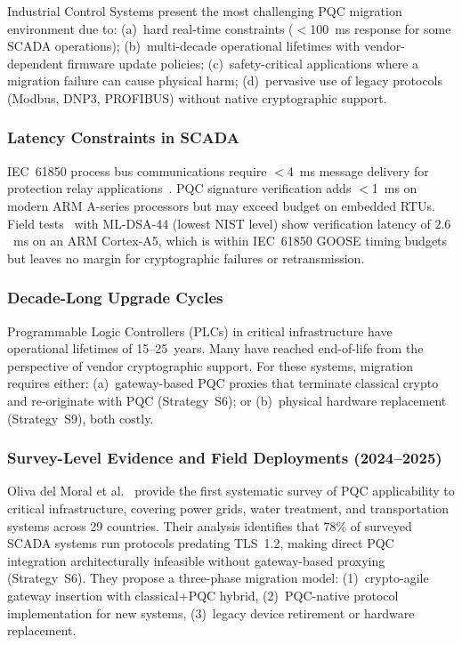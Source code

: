 \documentclass[journal]{IEEEtran}
\begin{document}
Industrial Control Systems present the most challenging PQC migration environment
due to: (a)~hard real-time constraints ($<$100~ms response for some SCADA
operations); (b)~multi-decade operational lifetimes with vendor-dependent
firmware update policies; (c)~safety-critical applications where a migration
failure can cause physical harm; (d)~pervasive use of legacy protocols
(Modbus, DNP3, PROFIBUS) without native cryptographic support.

\subsubsection{Latency Constraints in SCADA}

IEC~61850 process bus communications require $<$4~ms message delivery for
protection relay applications~\cite{iec61850}. PQC signature verification
adds $<$1~ms on modern ARM A-series processors but may exceed budget on
embedded RTUs. Field tests~\cite{tran2023pqc} with ML-DSA-44 (lowest NIST
level) show verification latency of $2.6$~ms on an ARM Cortex-A5, which
is within IEC~61850 GOOSE timing budgets but leaves no margin for cryptographic
failures or retransmission.

\subsubsection{Decade-Long Upgrade Cycles}

Programmable Logic Controllers (PLCs) in critical infrastructure have
operational lifetimes of 15--25~years. Many have reached end-of-life from
the perspective of vendor cryptographic support. For these systems,
migration requires either: (a)~gateway-based PQC proxies that terminate
classical crypto and re-originate with PQC (Strategy~S6); or (b)~physical
hardware replacement (Strategy~S9), both costly.

\subsubsection{Survey-Level Evidence and Field Deployments (2024--2025)}

Oliva del Moral et al.~\cite{olivamoral2024cybersecurity} provide the first
systematic survey of PQC applicability to critical infrastructure, covering
power grids, water treatment, and transportation systems across 29 countries.
Their analysis identifies that 78\% of surveyed SCADA systems run protocols
predating TLS~1.2, making direct PQC integration architecturally infeasible
without gateway-based proxying (Strategy~S6). They propose a three-phase
migration model: (1)~crypto-agile gateway insertion with classical+PQC hybrid,
(2)~PQC-native protocol implementation for new systems, (3)~legacy device
retirement or hardware replacement.
\end{document}
